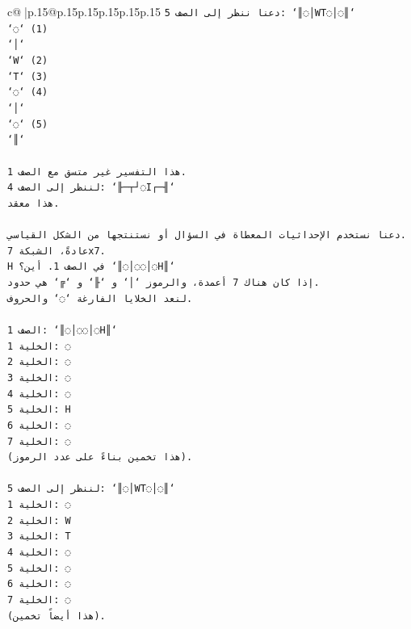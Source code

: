 \documentclass{article}
\begin{document}
{\begin{supertabular}{c@{$\;$}|p{.15\linewidth}@{}p{.15\linewidth}p{.15\linewidth}p{.15\linewidth}p{.15\linewidth}p{.15\linewidth}}
{{{\texttt{دعنا ننظر إلى الصف 5: `║◌│WT◌│◌║`} \\
\texttt{`◌` (1)} \\
\texttt{`│`} \\
\texttt{`W` (2)} \\
\texttt{`T` (3)} \\
\texttt{`◌` (4)} \\
\texttt{`│`} \\
\texttt{`◌` (5)} \\
\texttt{`║`} \\
\\ 
\texttt{هذا التفسير غير متسق مع الصف 1.} \\
\texttt{لننظر إلى الصف 4: `╟─┬┘◌I┌─╢`} \\
\texttt{هذا معقد.} \\
\\ 
\texttt{دعنا نستخدم الإحداثيات المعطاة في السؤال أو نستنتجها من الشكل القياسي.} \\
\texttt{عادةً، الشبكة 7x7.} \\
\texttt{H في الصف 1. أين؟ `║◌│◌◌│◌H║`} \\
\texttt{إذا كان هناك 7 أعمدة، والرموز `│` و `╟` و `╔` هي حدود.} \\
\texttt{لنعد الخلايا الفارغة `◌` والحروف.} \\
\\ 
\texttt{الصف 1: `║◌│◌◌│◌H║`} \\
\texttt{الخلية 1: ◌} \\
\texttt{الخلية 2: ◌} \\
\texttt{الخلية 3: ◌} \\
\texttt{الخلية 4: ◌} \\
\texttt{الخلية 5: H} \\
\texttt{الخلية 6: ◌} \\
\texttt{الخلية 7: ◌} \\
\texttt{(هذا تخمين بناءً على عدد الرموز).} \\
\\ 
\texttt{لننظر إلى الصف 5: `║◌│WT◌│◌║`} \\
\texttt{الخلية 1: ◌} \\
\texttt{الخلية 2: W} \\
\texttt{الخلية 3: T} \\
\texttt{الخلية 4: ◌} \\
\texttt{الخلية 5: ◌} \\
\texttt{الخلية 6: ◌} \\
\texttt{الخلية 7: ◌} \\
\texttt{(هذا أيضاً تخمين).} \\
}}}
\end{supertabular}}
\end{document}
